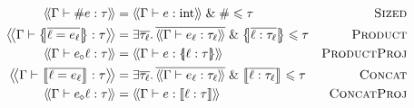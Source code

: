 \begin{align*}
\cstr{\Gamma}{\ssize e}{\tau} &= \cstr{\Gamma}{e}{\sint} \und \ssized \sub \tau 
&\textsc{Sized} \\
\cstr{\Gamma}{\sproductval{\overline{\ell = e_\ell}}}{\tau} &= \exists \overline{\tau_\ell} \ldotp \overline{\cstr{\Gamma}{e_\ell}{\tau_\ell}} \und \sproducttype{\overline{\ell : \tau_\ell}} \sub \tau
&\textsc{Product} \\
\cstr{\Gamma}{\sproductproj{e}{\ell}}{\tau} &= \cstr{\Gamma}{e}{\sproducttype{\ell : \tau}}
&\textsc{ProductProj} \\
\cstr{\Gamma}{\sconcatval{\overline{\ell = e_\ell}}}{\tau} &= \exists \overline{\tau_\ell} \ldotp \overline{\cstr{\Gamma}{e_\ell}{\tau_\ell}} \und \sconcattype{\overline{\ell : \tau_\ell}} \sub \tau
&\textsc{Concat} \\
\cstr{\Gamma}{\sconcatproj{e}{\ell}}{\tau} &= \cstr{\Gamma}{e}{\sconcattype{\ell : \tau}}
&\textsc{ConcatProj}
\end{align*}
